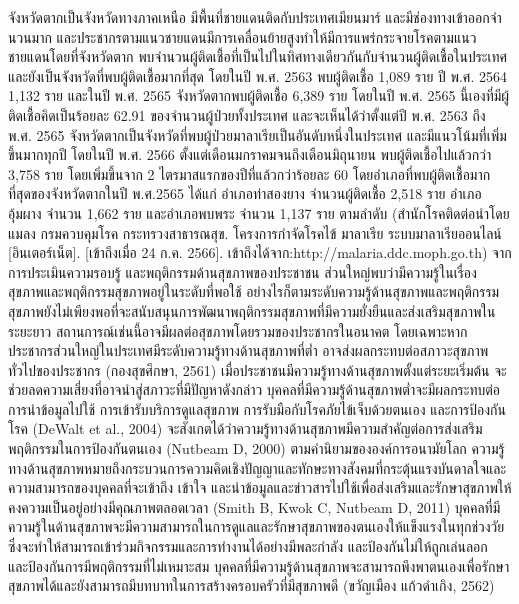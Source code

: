 \begin{titlepage}
\begin{enumerate}
{    จังหวัดตากเป็นจังหวัดทางภาคเหนือ มีพื้นที่ชายแดนติดกับประเทศเมียนมาร์  และมีช่องทางเข้าออกจํานวนมาก และประชากรตามแนวชายแดนมีการเคลื่อนย้ายสูงทําให้มีการแพร่กระจายโรคตามแนวชายแดนโดยที่จังหวัดตาก พบจำนวนผู้ติดเชื้อที่เป็นไปในทิศทางเดียวกันกับจำนวนผู้ติดเชื้อในประเทศ และยังเป็นจังหวัดที่พบผู้ติดเชื้อมากที่สุด โดยในปี พ.ศ. 2563 พบผู้ติดเชื้อ 1,089 ราย ปี พ.ศ. 2564 1,132 ราย และในปี พ.ศ. 2565 จังหวัดตากพบผู้ติดเชื้อ 6,389 ราย  โดยในปี พ.ศ. 2565 นี้เองที่มีผู้ติดเชื้อคิดเป็นร้อยละ 62.91 ของจำนวนผู้ป่วยทั้งประเทศ และจะเห็นได้ว่าตั้งแต่ปี พ.ศ. 2563 ถึง พ.ศ. 2565 จังหวัดตากเป็นจังหวัดที่พบผู้ป่วยมาลาเรียเป็นอันดับหนึ่งในประเทศ และมีแนวโน้มที่เพิ่มขึ้นมากทุกปี โดยในปี พ.ศ. 2566 ตั้งแต่เดือนมกราคมจนถึงเดือนมิถุนายน พบผู้ติดเชื้อไปแล้วกว่า 3,758 ราย โดยเพิ่มขึ้นจาก 2 ไตรมาสแรกของปีที่แล้วกว่าร้อยละ 60 โดยอำเภอที่พบผู้ติดเชื้อมากที่สุดของจังหวัดตากในปี พ.ศ.2565 ได้แก่ อำเภอท่าสองยาง จำนวนผู้ติดเชื้อ 2,518 ราย อำเภออุ้มผาง จำนวน 1,662 ราย และอำเภอพบพระ จำนวน 1,137 ราย ตามลำดับ (สํานักโรคติดต่อนําโดยแมลง  กรมควบคุมโรค กระทรวงสาธารณสุข.  โครงการกําจัดโรคไข้  มาลาเรีย ระบบมาลาเรียออนไลน์ [อินเตอร์เน็ต]. [เข้าถึงเมื่อ  24  ก.ค.  2566].  เข้าถึงได้จาก:http://malaria.ddc.moph.go.th)  
    จากการประเมินความรอบรู้ และพฤติกรรมด้านสุขภาพของประชาชน ส่วนใหญ่พบว่ามีความรู้ในเรื่องสุขภาพและพฤติกรรมสุขภาพอยู่ในระดับที่พอใช้ อย่างไรก็ตามระดับความรู้ด้านสุขภาพและพฤติกรรมสุขภาพยังไม่เพียงพอที่จะสนับสนุนการพัฒนาพฤติกรรมสุขภาพที่มีความยั่งยืนและส่งเสริมสุขภาพในระยะยาว สถานการณ์เช่นนี้อาจมีผลต่อสุขภาพโดยรวมของประชากรในอนาคต โดยเฉพาะหากประชากรส่วนใหญ่ในประเทศมีระดับความรู้ทางด้านสุขภาพที่ต่ำ อาจส่งผลกระทบต่อสภาวะสุขภาพทั่วไปของประชากร (กองสุขศึกษา, 2561) เมื่อประชาชนมีความรู้ทางด้านสุขภาพตั้งแต่ระยะเริ่มต้น จะช่วยลดความเสี่ยงที่อาจนำสู่สภาวะที่มีปัญหาดังกล่าว บุคคลที่มีความรู้ด้านสุขภาพต่ำจะมีผลกระทบต่อการนำข้อมูลไปใช้ การเข้ารับบริการดูแลสุขภาพ การรับมือกับโรคภัยไข้เจ็บด้วยตนเอง และการป้องกันโรค (DeWalt et al., 2004) จะสังเกตได้ว่าความรู้ทางด้านสุขภาพมีความสำคัญต่อการส่งเสริมพฤติกรรมในการป้องกันตนเอง (Nutbeam D, 2000) ตามคำนิยามขององค์การอนามัยโลก ความรู้ทางด้านสุขภาพหมายถึงกระบวนการความคิดเชิงปัญญาและทักษะทางสังคมที่กระตุ้นแรงบันดาลใจและความสามารถของบุคคลที่จะเข้าถึง เข้าใจ และนำข้อมูลและข่าวสารไปใช้เพื่อส่งเสริมและรักษาสุขภาพให้คงความเป็นอยู่อย่างมีคุณภาพตลอดเวลา (Smith B, Kwok C, Nutbeam D, 2011) บุคคลที่มีความรู้ในด้านสุขภาพจะมีความสามารถในการดูแลและรักษาสุขภาพของตนเองให้แข็งแรงในทุกช่วงวัย ซึ่งจะทำให้สามารถเข้าร่วมกิจกรรมและการทำงานได้อย่างมีพละกำลัง และป้องกันไม่ให้ถูกเล่นลอก และป้องกันการมีพฤติกรรมที่ไม่เหมาะสม บุคคลที่มีความรู้ด้านสุขภาพจะสามารถพึงพาตนเองเพื่อรักษาสุขภาพได้และยังสามารถมีบทบาทในการสร้างครอบครัวที่มีสุขภาพดี (ขวัญเมือง แก้วดำเกิง, 2562) 
}
\end{enumerate}
\end{titlepage}
